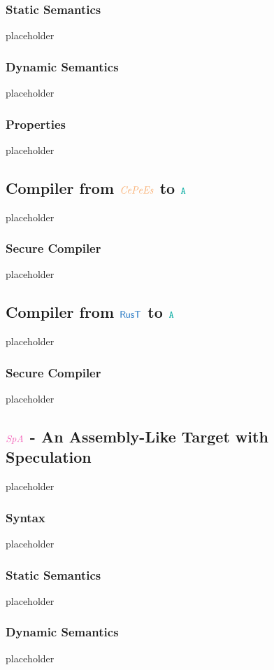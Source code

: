 \documentclass[a4paper,12pt]{article}
\begin{document}
\subsubsection{Static Semantics}\label{subsec-a-static}
placeholder
\subsubsection{Dynamic Semantics}\label{subsec-a-dynamic}
placeholder
\subsubsection{Properties}\label{subsec-a-properties}
placeholder


\subsection{Compiler from $\irl{CePeEs}$ to $\obj{A}$}\label{subsec-cepees-to-a}
placeholder
\subsubsection{Secure Compiler}\label{subsec-cepees-to-a-seccomp}
placeholder

\subsection{Compiler from $\src{RusT}$ to $\obj{A}$}\label{subsec-rust-to-a}
placeholder
\subsubsection{Secure Compiler}\label{subsec-rust-to-a-seccomp}
placeholder


\subsection{$\ird{SpA}$ - An Assembly-Like Target with Speculation}\label{subsec-spa}
placeholder
\subsubsection{Syntax}\label{subsec-spa-syntax}
placeholder
\subsubsection{Static Semantics}\label{subsec-spa-static}
placeholder
\subsubsection{Dynamic Semantics}\label{subsec-spa-dynamic}
placeholder
\end{document}
